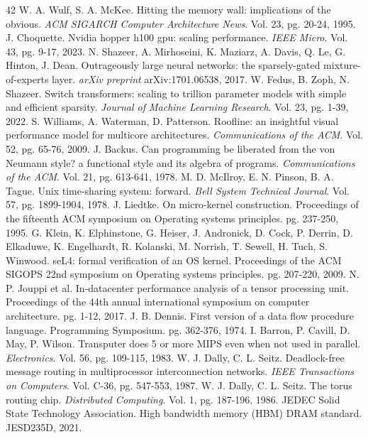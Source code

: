 \documentclass[12pt,onecolumn]{article}
\begin{document}
\begin{thebibliography}{42}
 W. A. Wulf, S. A. McKee. Hitting the memory wall: implications of the obvious. \textit{ACM SIGARCH Computer Architecture News}. Vol. 23, pg. 20-24, 1995.
 J. Choquette. Nvidia hopper h100 gpu: scaling performance. \textit{IEEE Micro}. Vol. 43, pg. 9-17, 2023.
 N. Shazeer, A. Mirhoseini, K. Maziarz, A. Davis, Q. Le, G. Hinton, J. Dean. Outrageously large neural networks: the sparsely-gated mixture-of-experts layer. \textit{arXiv preprint} arXiv:1701.06538, 2017.
 W. Fedus, B. Zoph, N. Shazeer. Switch transformers: scaling to trillion parameter models with simple and efficient sparsity. \textit{Journal of Machine Learning Research}. Vol. 23, pg. 1-39, 2022.
 S. Williams, A. Waterman, D. Patterson. Roofline: an insightful visual performance model for multicore architectures. \textit{Communications of the ACM}. Vol. 52, pg. 65-76, 2009.
 J. Backus. Can programming be liberated from the von Neumann style? a functional style and its algebra of programs. \textit{Communications of the ACM}. Vol. 21, pg. 613-641, 1978.
 M. D. McIlroy, E. N. Pinson, B. A. Tague. Unix time-sharing system: forward. \textit{Bell System Technical Journal}. Vol. 57, pg. 1899-1904, 1978.
 J. Liedtke. On micro-kernel construction. Proceedings of the fifteenth ACM symposium on Operating systems principles. pg. 237-250, 1995.
 G. Klein, K. Elphinstone, G. Heiser, J. Andronick, D. Cock, P. Derrin, D. Elkaduwe, K. Engelhardt, R. Kolanski, M. Norrish, T. Sewell, H. Tuch, S. Winwood. seL4: formal verification of an OS kernel. Proceedings of the ACM SIGOPS 22nd symposium on Operating systems principles. pg. 207-220, 2009.
 N. P. Jouppi et al. In-datacenter performance analysis of a tensor processing unit. Proceedings of the 44th annual international symposium on computer architecture. pg. 1-12, 2017.
 J. B. Dennis. First version of a data flow procedure language. Programming Symposium. pg. 362-376, 1974.
 I. Barron, P. Cavill, D. May, P. Wilson. Transputer does 5 or more MIPS even when not used in parallel. \textit{Electronics}. Vol. 56, pg. 109-115, 1983.
 W. J. Dally, C. L. Seitz. Deadlock-free message routing in multiprocessor interconnection networks. \textit{IEEE Transactions on Computers}. Vol. C-36, pg. 547-553, 1987.
 W. J. Dally, C. L. Seitz. The torus routing chip. \textit{Distributed Computing}. Vol. 1, pg. 187-196, 1986.
 JEDEC Solid State Technology Association. High bandwidth memory (HBM) DRAM standard. JESD235D, 2021.

\end{thebibliography}
\end{document}
